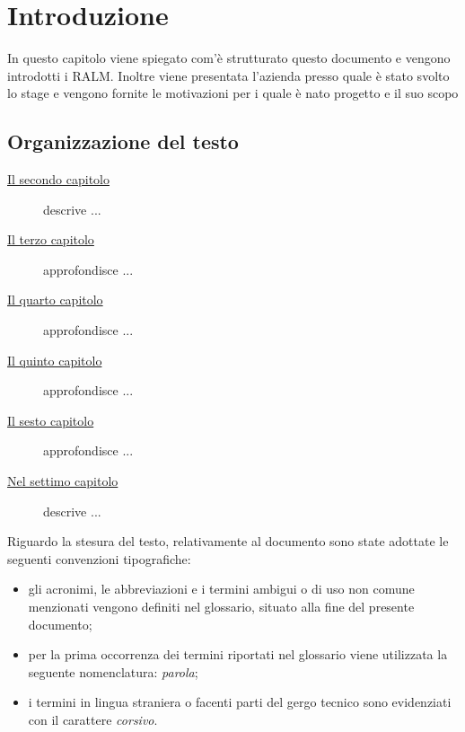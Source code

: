 \chapter{Introduzione}
\label{cap:introduzione}

In questo capitolo viene spiegato com'è strutturato questo documento e vengono introdotti i RALM.
Inoltre viene presentata l'azienda presso quale è stato svolto lo stage e vengono 
fornite le motivazioni per i quale è nato progetto e il suo scopo

\section{Organizzazione del testo}

\begin{description}
    \item[{\hyperref[cap:processi-metodologie]{Il secondo capitolo}}] descrive ...
    
    \item[{\hyperref[cap:descrizione-stage]{Il terzo capitolo}}] approfondisce ...
    
    \item[{\hyperref[cap:analisi-requisiti]{Il quarto capitolo}}] approfondisce ...
    
    \item[{\hyperref[cap:progettazione-codifica]{Il quinto capitolo}}] approfondisce ...
    
    \item[{\hyperref[cap:verifica-validazione]{Il sesto capitolo}}] approfondisce ...
    
    \item[{\hyperref[cap:conclusioni]{Nel settimo capitolo}}] descrive ...
\end{description}

Riguardo la stesura del testo, relativamente al documento sono state adottate le seguenti convenzioni tipografiche:
\begin{itemize}
	\item gli acronimi, le abbreviazioni e i termini ambigui o di uso non comune menzionati vengono definiti nel glossario, situato alla fine del presente documento;
	\item per la prima occorrenza dei termini riportati nel glossario viene utilizzata la seguente nomenclatura: \emph{parola}\glsfirstoccur;
	\item i termini in lingua straniera o facenti parti del gergo tecnico sono evidenziati con il carattere \emph{corsivo}.
\end{itemize}


